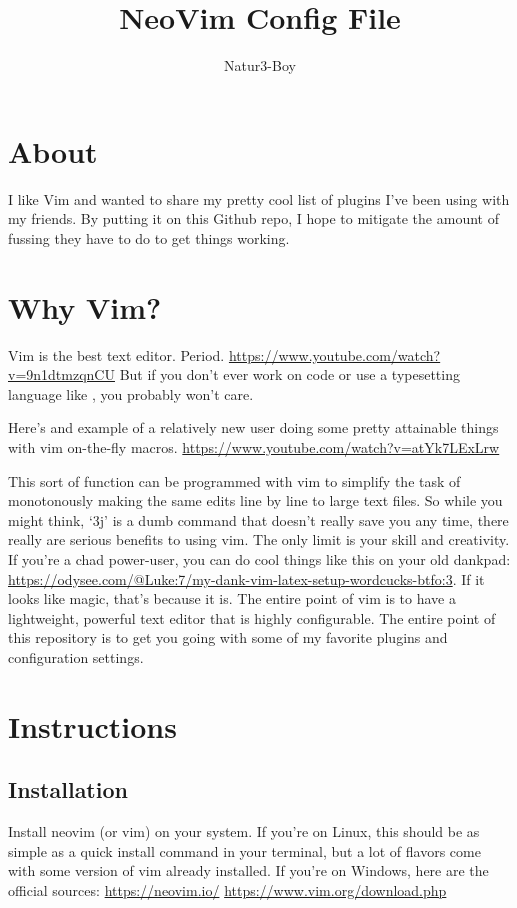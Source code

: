 \documentclass[12pt]{article}
\author{Natur3-Boy}
\title{NeoVim Config File}
\begin{document}
\maketitle

\section{About}

I like Vim and wanted to share my pretty cool list of plugins I've been using with my friends. 
By putting it on this Github repo, I hope to mitigate the amount of fussing they have to do to get things working.

\section{Why Vim?}
Vim is the best text editor. Period.
\url{https://www.youtube.com/watch?v=9n1dtmzqnCU}
But if you don't ever work on code or use a typesetting language like \LaTex, you probably won't care.


Here's and example of a relatively new user doing some pretty attainable things with vim on-the-fly macros.
\url{https://www.youtube.com/watch?v=atYk7LExLrw}

This sort of function can be programmed with vim to simplify the task of monotonously making the same edits line by line to large text files.
So while you might think, `3j' is a dumb command that doesn't really save you any time, 
there really are serious benefits to using vim. 
The only limit is your skill and creativity.
If you're a chad power-user, you can do cool things like this on your old dankpad:
\url{https://odysee.com/@Luke:7/my-dank-vim-latex-setup-wordcucks-btfo:3}.
If it looks like magic, that's because it is. 
The entire point of vim is to have a lightweight, powerful text editor that is highly configurable.
The entire point of this repository is to get you going with some of my favorite plugins and configuration settings.

\section{Instructions}
\subsection{Installation}

Install neovim (or vim) on your system.
If you're on Linux, 
this should be as simple as a quick install command in your terminal,
but a lot of flavors come with some version of vim already installed.
If you're on Windows, here are the official sources:
\url{https://neovim.io/}
\url{https://www.vim.org/download.php}
\end{document}
